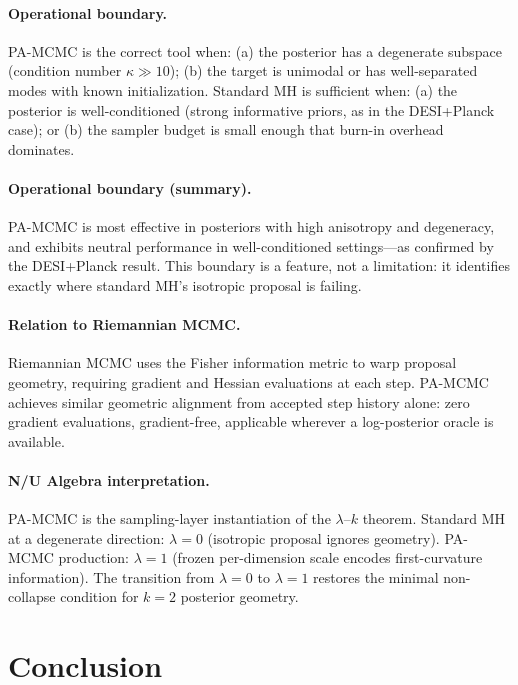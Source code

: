 \documentclass[11pt]{article}
\theoremstyle{definition}
\begin{document}
\paragraph{Operational boundary.}
PA-MCMC is the correct tool when: (a) the posterior has a degenerate subspace
(condition number $\kappa \gg 10$); (b) the target is unimodal or has well-separated
modes with known initialization.
Standard MH is sufficient when: (a) the posterior is well-conditioned (strong
informative priors, as in the DESI+Planck case); or (b) the sampler budget is
small enough that burn-in overhead dominates.

\paragraph{Operational boundary (summary).}
PA-MCMC is most effective in posteriors with high anisotropy and degeneracy,
and exhibits neutral performance in well-conditioned settings—as confirmed
by the DESI+Planck result.
This boundary is a feature, not a limitation: it identifies exactly where
standard MH's isotropic proposal is failing.

\paragraph{Relation to Riemannian MCMC.}
Riemannian MCMC \cite{girolami2011riemann} uses the Fisher information metric to
warp proposal geometry, requiring gradient and Hessian evaluations at each step.
PA-MCMC achieves similar geometric alignment from accepted step history alone:
zero gradient evaluations, gradient-free, applicable wherever a log-posterior
oracle is available.

\paragraph{N/U Algebra interpretation.}
PA-MCMC is the sampling-layer instantiation of the $\lambda$--$k$ theorem.
Standard MH at a degenerate direction: $\lambda=0$ (isotropic proposal ignores geometry).
PA-MCMC production: $\lambda=1$ (frozen per-dimension scale encodes first-curvature
information).
The transition from $\lambda=0$ to $\lambda=1$ restores the minimal non-collapse
condition for $k=2$ posterior geometry.

\section{Conclusion}
\end{document}

